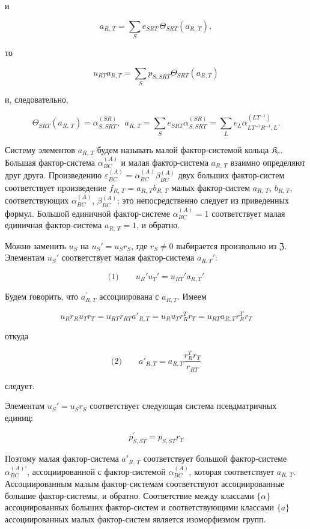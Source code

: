 \documentclass[11pt]{article}
\begin{document}
и

\[a_{R,\,T} = \sum\limits_{S} e_{SRT}\, \Theta_{SRT} \left(a_{R,\,T}\right),\]

то

\[u_{RT} a_{R,T} = \sum\limits_{S} p_{S,SRT} \Theta_{SRT} (a_{R,T})\]

и, следовательно,

\[\Theta_{SRT}(a_{R,\,T}) = \alpha_{S,SRT}^{(SR)}, ~~ a_{R,\,T} = \sum\limits_{S} e_{SRT} \alpha_{S,SRT}^{(SR)} = \sum\limits_{L} e_{L} \alpha_{LT^{-1}R^{-1},L}^{(LT^{-1})}.\]

Систему элементов \(a_{R,\,T}\) будем называть малой фактор-системой кольца \(\mathfrak K_r\). Большая фактор-система \(\alpha_{BC}^{(A)}\) и малая фактор-система \(a_{R,\,T}\) взаимно определяют друг друга. Произведению \(\varepsilon_{BC}^{(A)} = \alpha_{BC}^{(A)} \beta_{BC}^{(A)}\) двух больших фактор-систем соответствует произведение \(f_{R,\,T} = a_{R,\,T}b_{R,\,T}\) малых фактор-систем \(a_{R,\,T}\), \(b_{R,\,T}\), соответствующих \(\alpha_{BC}^{(A)}\), \(\beta_{BC}^{(A)}\); это непосредственно следует из приведенных формул. Большой единичной фактор-системе \(\alpha_{BC}^{(A)} = 1\) соответствует малая единичная фактор-система \(a_{R,\,T} = 1\), и обратно.

Можно заменить \(u_S\) на \(u_S'=u_Sr_S\), где \(r_S\neq 0\) выбирается произвольно из \(\mathfrak Z\). Элементам \(u_S'\) соответствует малая фактор-система \(a_{R,T}'\):

\[
\text{(1)}\qquad u_R'u_T'=u_{RT}'a_{R,T}'
\]

Будем говорить, что \(a_{R,T}^{\prime}\) ассоциирована с \(a_{R,T}\). Имеем

\[u_R r_R u_T r_T = u_{RT} r_{RT} a'_{R,T} = u_R u_T r_R^T r_T = u_{RT} a_{R,T} r_R^T r_T\]

откуда

\[
\text{(2)}\qquad a'_{R,T}=a_{R,T}\frac{r_R^T r_T}{r_{RT}}
\]

следует.

Элементам \(u_S' = u_S r_S\) соответствует следующая система псевдматричных единиц:

\[p_{S,ST}^{\prime}=p_{S,ST}r_{T}\]

Поэтому малая фактор-система \(a'_{R,\,T}\) соответствует большой фактор-системе \(\alpha^{(A)\prime}_{BC}\), ассоциированной с фактор-системой \(\alpha^{(A)}_{BC}\), которая соответствует \(a_{R,\,T}\). Ассоциированным малым фактор-системам соответствуют ассоциированные большие фактор-системы, и обратно. Соответствие между классами \(\{\alpha\}\) ассоциированных больших фактор-систем и соответствующими классами \(\{a\}\) ассоциированных малых фактор-систем является изоморфизмом групп.
\end{document}
